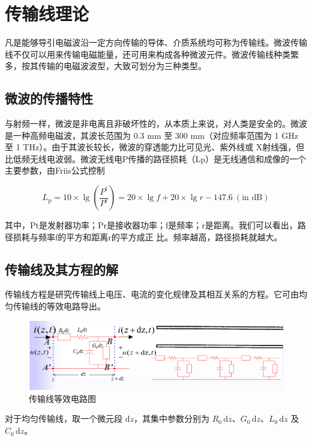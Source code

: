 \section{传输线理论}

凡是能够导引电磁波沿一定方向传输的导体、介质系统均可称为传输线。微波传输线不仅可以用来传输电磁能量，还可用来构成各种微波元件。微波传输线种类繁多，按其传输的电磁波波型，大致可划分为三种类型。

\subsection{微波的传播特性}

与射频一样，微波是非电离且非破坏性的，从本质上来说，对人类是安全的。微波是一种高频电磁波，其波长范围为 0.3 mm 至 300 mm（对应频率范围为 1 GHz 至 1 THz）。由于其波长较长，微波的穿透能力比可见光、紫外线或 X射线强，但比低频无线电波弱。微波无线电P传播的路径损耗（Lp）是无线通信和成像的一个主要参数，由Friis公式\cite{huang2021antennas}控制

\begin{equation}
	L_{\mathrm{p}} = 10 \times \lg \left( \frac{P^{\mathrm{t}}}{P^{\mathrm{r}}} \right) = 20 \times \lg f + 20 \times \lg r - 147.6 \ (\text{in dB})
	\tag{1}
\end{equation}



其中，Pt是发射器功率；Pr是接收器功率；f是频率；r是距离。我们可以看出，路径损耗与频率f的平方和距离r的平方成正
比。频率越高，路径损耗就越大。


\subsection{传输线及其方程的解}

传输线方程是研究传输线上电压、电流的变化规律及其相互关系的方程。它可由均匀传输线的等效电路导出。

\begin{figure}[htbp]
	\centering
	\includegraphics[width=0.8\linewidth]{img/2-1.png}
	\caption{传输线等效电路图}
	\label{fig:2-1}
\end{figure}

对于均匀传输线，取一个微元段 \( \mathrm{d}z \)，其集中参数分别为 \( R_0 \, \mathrm{d}z \)、\( G_0 \, \mathrm{d}z \)、\( L_0 \, \mathrm{d}z \) 及 \( C_0 \, \mathrm{d}z \)。

